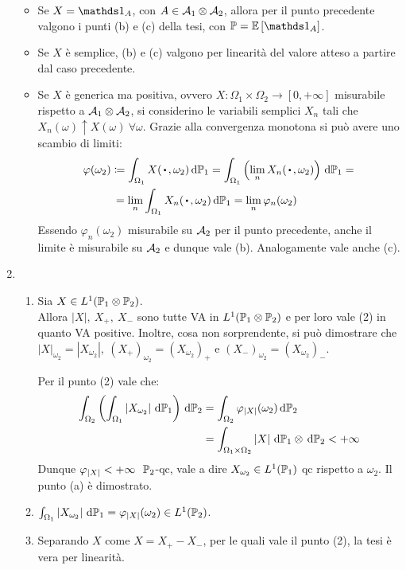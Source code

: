 \begin{dimo}
\begin{enumerate}
\begin{itemize}
      \item Se $X=\Ind_A$, con $A \in \mathcal A_1 \otimes \mathcal A_2$, allora per il punto precedente valgono i punti (b) e (c) della tesi, con $\PP=\Ex{\Ind_A}$.
      \item Se $X$ è semplice, (b) e (c) valgono per linearità del valore atteso a partire dal caso precedente.
      \item Se $X$ è generica ma positiva, ovvero $X: \Omega_1 \times \Omega_2 \to \left [0, +\infty \right ]$  misurabile rispetto a $\mathcal A_1 \otimes \mathcal A_2$, si considerino le variabili semplici $X_n$ tali che $X_n(\omega) \uparrow X(\omega) \ \forall \omega$.
      Grazie alla convergenza monotona si può avere uno scambio di limiti:
      \begin{align*}
        \varphi(\omega_2) & \coloneqq \int_{\Omega_1}X(\, \bigcdot \, , \omega_2)\, \dPP_1= \int_{\Omega_1}\left(\lim_{n}X_n(\, \bigcdot \, , \omega_2)\right)\, \dPP_1 =\\
        & \, = \lim_{n} \int_{\Omega_1} X_n(\, \bigcdot \, ,\omega_2)\, \dPP_1= \lim_{n} \varphi_n(\omega_2)
      \end{align*}
      Essendo $\varphi_n(\omega_2)$ misurabile su $\mathcal A_2$ per il punto precedente, anche il limite è misurabile su $\mathcal A_2$ e dunque vale (b). Analogamente vale anche (c).
        \end{itemize}
    \item
      \begin{enumerate}
      \renewcommand{\labelenumi}{\alph{enumi})}
      \item Sia $X \in L^1(\mathbb P_1 \otimes \mathbb P_2)$. \\
      Allora $\left | X \right |, \ X_+, \ X_-$ sono tutte VA in $L^1(\mathbb P_1 \otimes \mathbb P_2)$ e per loro vale (2) in quanto VA positive.
      Inoltre, cosa non sorprendente, si può dimostrare che $\left | X \right |_{\omega_2}=\left | X_{\omega_2} \right |, \ (X_+)_{\omega_2}=(X_{\omega_2})_+$ e $(X_-)_{\omega_2}=(X_{\omega_2})_-$.

          Per il punto (2) vale che:
      \begin{align*}
      \int_{\Omega_2} \left( \int_{\Omega_1} \left | X_{\omega_2} \right | \, \mathrm d \mathbb P_1 \right) \, \mathrm d \mathbb P_2
      &= \int_{\Omega_2} \varphi_{\left | X \right |}(\omega_2)  \, \mathrm d \mathbb P_2 \\
      &= \int_{\Omega_1 \times \Omega_2} \left | X \right | \, \mathrm d \mathbb P_1 \otimes \, \mathrm d \mathbb P_2 < +\infty
      \end{align*}
      Dunque $\varphi_{\left | X \right |} < +\infty \ \ \mathbb P_2$-qc, vale a dire $X_{\omega_2} \in L^1(\mathbb P_1)$ qc rispetto a $\omega_2$. Il punto (a) è dimostrato.
      \item $ \int_{\Omega_1} \left | X_{\omega_2} \right | \, \mathrm d \mathbb P_1=\varphi_{\left | X \right |}(\omega_2) \in L^1(\mathbb P_2)$.
      \item Separando $X$ come $X= X_+-X_-$, per le quali vale il punto (2), la tesi è vera per linearità. \qedhere
      \end{enumerate}
  \end{enumerate}
\end{dimo}


